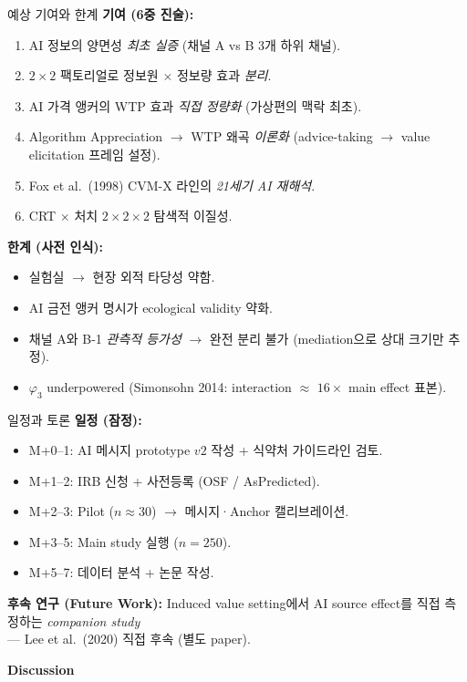 \documentclass[aspectratio=169]{beamer}
\begin{document}
\begin{frame}{예상 기여와 한계}
  \textbf{기여 (6중 진술):}
  \begin{enumerate}\itemsep0.1em
    \item AI 정보의 양면성 \emph{최초 실증} (채널 A vs B 3개 하위 채널).
    \item $2 \times 2$ 팩토리얼로 정보원 $\times$ 정보량 효과 \emph{분리}.
    \item AI 가격 앵커의 WTP 효과 \emph{직접 정량화} (가상편의 맥락 최초).
    \item Algorithm Appreciation $\rightarrow$ WTP 왜곡 \emph{이론화} (advice-taking $\rightarrow$ value elicitation 프레임 설정).
    \item Fox et al.\ (1998) CVM-X 라인의 \emph{21세기 AI 재해석}.
    \item CRT $\times$ 처치 $2 \times 2 \times 2$ 탐색적 이질성.
  \end{enumerate}

  \vspace{0.4em}
  \textbf{한계 (사전 인식):}
  \begin{itemize}\itemsep0.05em
    \item 실험실 $\rightarrow$ 현장 외적 타당성 약함.
    \item AI 금전 앵커 명시가 ecological validity 약화.
    \item 채널 A와 B-1 \emph{관측적 등가성} $\rightarrow$ 완전 분리 불가 (mediation으로 상대 크기만 추정).
    \item $\varphi_3$ underpowered (Simonsohn 2014: interaction $\approx$ $16 \times$ main effect 표본).
  \end{itemize}
\end{frame}

\begin{frame}{일정과 토론}
  \textbf{일정 (잠정):}
  \begin{itemize}\itemsep0.1em
    \item M+0--1: AI 메시지 prototype $v2$ 작성 + 식약처 가이드라인 검토.
    \item M+1--2: IRB 신청 + 사전등록 (OSF / AsPredicted).
    \item M+2--3: Pilot ($n \approx 30$) $\rightarrow$ 메시지·Anchor 캘리브레이션.
    \item M+3--5: Main study 실행 ($n = 250$).
    \item M+5--7: 데이터 분석 + 논문 작성.
  \end{itemize}

  \vspace{0.5em}
  \textbf{후속 연구 (Future Work):}
  Induced value setting에서 AI source effect를 직접 측정하는 \emph{companion study}\\
  --- Lee et al.\ (2020) 직접 후속 (별도 paper).

  \vspace{0.8em}
  \begin{center}
    \Large \textbf{Discussion}
  \end{center}
\end{frame}
\end{document}
